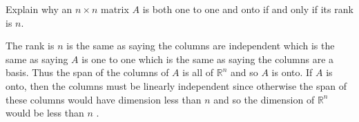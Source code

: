 \begin{enumialphparenastyle}
\begin{ex} Explain why an $n\times n$ matrix $A$ is both one to one and onto if
and only if its rank is $n.$ \vspace{1mm}
\begin{sol}
The rank is $n$ is the same as saying the
columns are independent which is the same as saying $A$ is one to one which
is the same as saying the columns are a basis. Thus the span of the columns
of $A$ is all of $\mathbb{R}^{n}$ and so $A$ is onto. If $A$ is onto, then
the columns must be linearly independent since otherwise the span of these
columns would have dimension less than $n$ and so the dimension of $\mathbb{R}^{n}$ would be less than $n$ .
\end{sol}
\end{ex}

\end{enumialphparenastyle}
